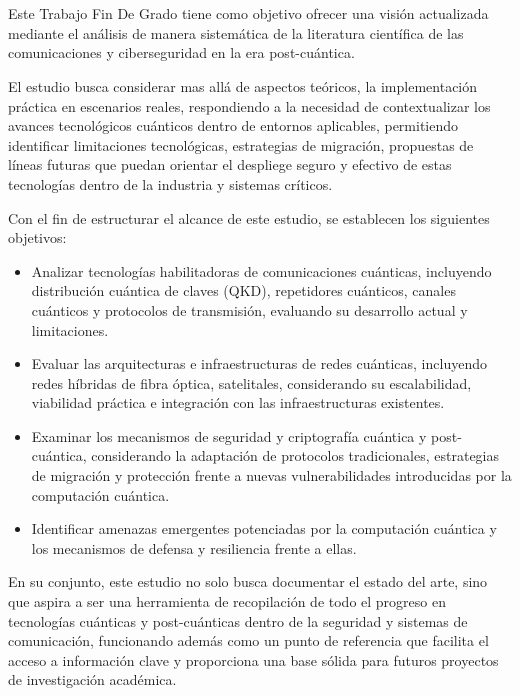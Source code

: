 \chapter{\objectivesname}
Este Trabajo Fin De Grado tiene como objetivo ofrecer una visión actualizada mediante el análisis de manera sistemática de la literatura científica de las comunicaciones y ciberseguridad en la era post-cuántica.

El estudio busca considerar mas allá de aspectos teóricos, la implementación práctica en escenarios reales, respondiendo a la necesidad de contextualizar los avances tecnológicos cuánticos dentro de entornos aplicables, permitiendo identificar limitaciones tecnológicas, estrategias de migración, propuestas de líneas futuras que puedan orientar el despliege seguro y efectivo de estas tecnologías dentro de la industria y sistemas críticos.

Con el fin de estructurar el alcance de este estudio, se establecen los siguientes objetivos:

\begin{itemize} %
    \item Analizar tecnologías habilitadoras de comunicaciones cuánticas, incluyendo distribución cuántica de claves (QKD), repetidores cuánticos, canales cuánticos y protocolos de transmisión, evaluando su desarrollo actual y limitaciones.
    \item Evaluar las arquitecturas e infraestructuras de redes cuánticas, incluyendo redes híbridas de fibra óptica, satelitales, considerando su escalabilidad, viabilidad práctica e integración con las infraestructuras existentes.
    \item Examinar los mecanismos de seguridad y criptografía cuántica y post-cuántica, considerando la adaptación de protocolos tradicionales, estrategias de migración y protección frente a nuevas vulnerabilidades introducidas por la computación cuántica.
    \item Identificar amenazas emergentes potenciadas por la computación cuántica y los mecanismos de defensa y resiliencia frente a ellas.
\end{itemize}

En su conjunto, este estudio no solo busca documentar el estado del arte, sino que aspira a ser una herramienta de recopilación de todo el progreso en tecnologías cuánticas y post-cuánticas dentro de la seguridad y sistemas de comunicación, funcionando además como un punto de referencia que facilita el acceso a información clave y proporciona una base sólida para futuros proyectos de investigación académica. 


